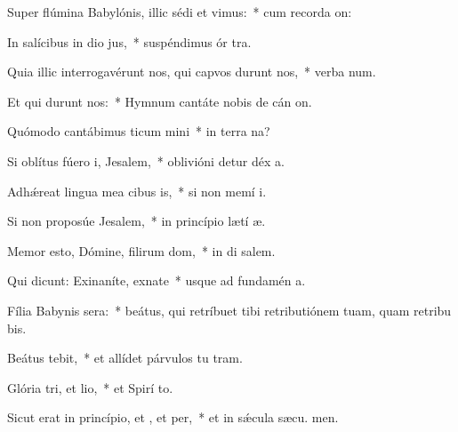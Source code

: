 \item Super flúmina Babylónis, illic sédi et vimus:~* cum recorda on:
\item In salícibus in dio jus,~* suspéndimus ór tra.
\item Quia illic interrogavérunt nos, qui capvos durunt nos,~* verba num.
\item Et qui durunt nos:~* Hymnum cantáte nobis de cán on.
\item Quómodo cantábimus ticum mini~* in terra na?
\item Si oblítus fúero i, Jesalem,~* oblivióni detur déx a.
\item Adhǽreat lingua mea cibus is,~* si non memí i.
\item Si non proposúe Jesalem,~* in princípio lætí æ.
\item Memor esto, Dómine, filirum dom,~* in di salem.
\item Qui dicunt: Exinaníte, exnate~* usque ad fundamén  a.
\item Fília Babynis sera:~* beátus, qui retríbuet tibi retributiónem tuam, quam retribu bis.
\item Beátus  tebit,~* et allídet párvulos tu  tram.
\item Glória tri, et lio,~* et Spirí to.
\item Sicut erat in princípio, et , et per,~* et in sǽcula sæcu. men.
